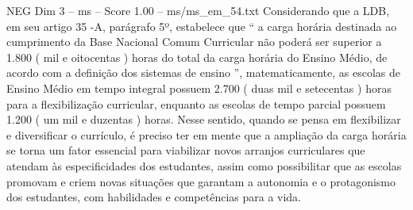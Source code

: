 \begin{textsample}{NEG Dim 3 – ms – Score 1.00 – ms/ms\_em\_54.txt}
Considerando que a LDB, em seu artigo 35 -A, parágrafo 5º, estabelece que “ a carga horária destinada ao cumprimento da Base Nacional Comum Curricular não poderá ser superior a 1.800 ( mil e oitocentas ) horas do total da carga horária do Ensino Médio, de acordo com a definição dos sistemas de ensino ”, matematicamente, as escolas de Ensino Médio em tempo integral possuem 2.700 ( duas mil e setecentas ) horas para a flexibilização curricular, enquanto as escolas de tempo parcial possuem 1.200 ( um mil e duzentas ) horas.
Nesse sentido, quando se pensa em flexibilizar e diversificar o currículo, é preciso ter em mente que a ampliação da carga horária se torna um fator essencial para viabilizar novos arranjos curriculares que atendam às especificidades dos estudantes, assim como possibilitar que as escolas promovam e criem novas situações que garantam a autonomia e o protagonismo dos estudantes, com habilidades e competências para a vida.

\end{textsample}
